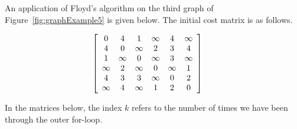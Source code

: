 \begin{Example}
\label{eg:floyd}
An application of Floyd's algorithm on the third graph of
Figure~\ref{fig:graphExample5} is given below.  The initial cost 
matrix is as follows.

\[ 
\left[
\begin{array}{cccccc} %
0        & 4        & 1        & \infty & 4        & \infty \\
4        & 0        & \infty & 2        & 3        & 4 \\
1        &  \infty  & 0        &  \infty  & 3        &  \infty  \\
 \infty  & 2        &  \infty  & 0        &  \infty  & 1 \\
4        & 3        & 3        &  \infty  & 0        & 2 \\
 \infty  & 4        &  \infty  & 1        & 2        & 0 \\
\end{array}
\right]
\hspace{.5cm}
\]

In the matrices below, the index $k$ refers to
the number of times we have been through the outer for-loop.


\end{Example}
